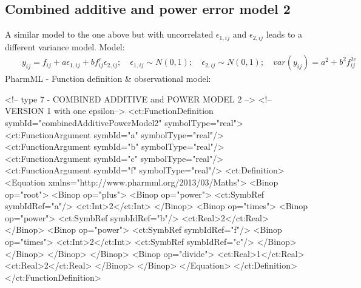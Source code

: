\documentclass[a4paper,10pt]{article}
\begin{document}
\subsection{Combined additive and power error model 2}
\label{model7}
A similar model to the one above but with uncorrelated $\epsilon_{1,ij}$ and $\epsilon_{2,ij}$ leads to a different variance model.
Model:
\begin{eqnarray}
&& y_{ij} = f_{ij} + a\epsilon_{1,ij} + b f_{ij}^c \epsilon_{2,ij}; \quad \epsilon_{1,ij} \sim N(0,1); \quad \epsilon_{2,ij} \sim N(0,1); \quad \mathit{var}(y_{ij}) = a^2 + b^2f_{ij}^{2c} \nonumber
\end{eqnarray}
PharmML - Function definition \& observational model:
\begin{xmlcode}
<!-- type 7 - COMBINED ADDITIVE and POWER MODEL 2 -->
<!-- VERSION 1 with one epsilon-->
<ct:FunctionDefinition symbId="combinedAdditivePowerModel2" symbolType="real">
    <ct:FunctionArgument symbId="a" symbolType="real"/>
    <ct:FunctionArgument symbId="b" symbolType="real"/>
    <ct:FunctionArgument symbId="c" symbolType="real"/>
    <ct:FunctionArgument symbId="f" symbolType="real"/>
    <ct:Definition>
        <Equation xmlns="http://www.pharmml.org/2013/03/Maths">
            <Binop op="root">
                <Binop op="plus">
                    <Binop op="power">
                        <ct:SymbRef symbIdRef="a"/>
                        <ct:Int>2</ct:Int>
                    </Binop>
                    <Binop op="times">
                        <Binop op="power">
                            <ct:SymbRef symbIdRef="b"/>
                            <ct:Real>2</ct:Real>
                        </Binop>
                        <Binop op="power">
                            <ct:SymbRef symbIdRef="f"/>
                            <Binop op="times">
                                <ct:Int>2</ct:Int>
                                <ct:SymbRef symbIdRef="c"/>
                            </Binop>
                        </Binop>
                    </Binop>
                </Binop>
                <Binop op="divide">
                    <ct:Real>1</ct:Real>
                    <ct:Real>2</ct:Real>
                </Binop>
            </Binop>
        </Equation>
    </ct:Definition>
</ct:FunctionDefinition>


\end{xmlcode}
\end{document}
